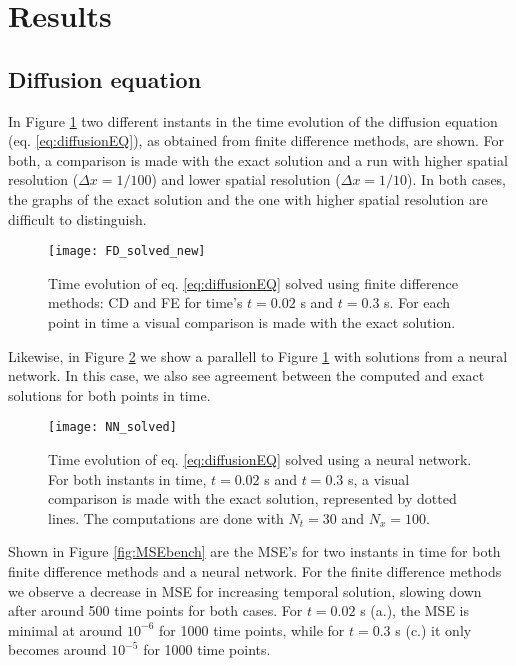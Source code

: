 \section{Results}
\label{sec:results}

\subsection{Diffusion equation}

In Figure \ref{fig:FDcompare} two different instants in the time evolution of the diffusion equation (eq. \ref{eq:diffusionEQ}), as obtained from finite difference methods, are shown. For both, a comparison is made with the exact solution and a run with higher spatial resolution ($\Delta x = 1/100$) and lower spatial resolution ($\Delta x = 1/10$). In both cases, the graphs of the exact solution and the one with higher spatial resolution are difficult to distinguish.
 \begin{figure}[htbp]
  	\centering
  	\texttt{[image: FD\_solved\_new]}
  	\caption{Time evolution of eq. \ref{eq:diffusionEQ} solved using finite difference methods: CD and FE for time's $t=0.02$ s and $t=0.3$ s. For each point in time a visual comparison is made with the exact solution.}
   \label{fig:FDcompare}
 \end{figure}

Likewise, in Figure \ref{fig:NNcompare} we show a parallell to Figure \ref{fig:FDcompare} with solutions from a neural network. In this case, we also see agreement between the computed and exact solutions for both points in time.
 \begin{figure}[htbp]
  	\centering
  	\texttt{[image: NN\_solved]}
  	\caption{Time evolution of eq. \ref{eq:diffusionEQ} solved using a neural network. For both instants in time, $t=0.02$ s and $t=0.3$ s, a visual comparison is made with the exact solution, represented by dotted lines. The computations are done with $N_t = 30$ and $N_x = 100$.}
   \label{fig:NNcompare}
 \end{figure}

Shown in Figure \ref{fig:MSEbench} are the MSE's for two instants in time for both finite difference methods and a neural network. For the finite difference methods we observe a decrease in MSE for increasing temporal solution, slowing down after around 500 time points for both cases. For $t=0.02$ s (a.), the MSE is minimal at around $10^{-6}$ for 1000 time points, while for $t=0.3$ s (c.) it only becomes around $10^{-5}$ for 1000 time points.

